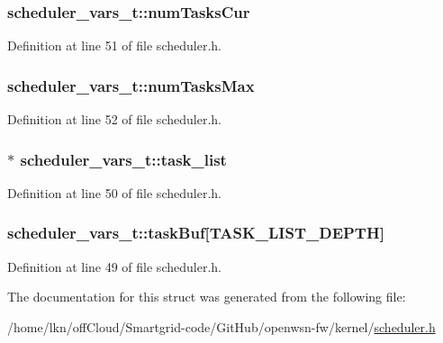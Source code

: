 \subsubsection[{\texorpdfstring{num\+Tasks\+Cur}{numTasksCur}}]{ scheduler\+\_\+vars\+\_\+t\+::num\+Tasks\+Cur}\hypertarget{structscheduler__vars__t_a5847653bd49ad9fcd6474f5ab43b8440}{}\label{structscheduler__vars__t_a5847653bd49ad9fcd6474f5ab43b8440}


Definition at line 51 of file scheduler.\+h.

\subsubsection[{\texorpdfstring{num\+Tasks\+Max}{numTasksMax}}]{ scheduler\+\_\+vars\+\_\+t\+::num\+Tasks\+Max}\hypertarget{structscheduler__vars__t_ad2a68894b5c8d2ca6199fc6201429d6d}{}\label{structscheduler__vars__t_ad2a68894b5c8d2ca6199fc6201429d6d}


Definition at line 52 of file scheduler.\+h.

\subsubsection[{\texorpdfstring{task\+\_\+list}{task_list}}]{$\ast$ scheduler\+\_\+vars\+\_\+t\+::task\+\_\+list}\hypertarget{structscheduler__vars__t_ac11491c1035581debc6a9572d257cd35}{}\label{structscheduler__vars__t_ac11491c1035581debc6a9572d257cd35}


Definition at line 50 of file scheduler.\+h.

\subsubsection[{\texorpdfstring{task\+Buf}{taskBuf}}]{ scheduler\+\_\+vars\+\_\+t\+::task\+Buf\mbox{[}{\bf T\+A\+S\+K\+\_\+\+L\+I\+S\+T\+\_\+\+D\+E\+P\+TH}\mbox{]}}\hypertarget{structscheduler__vars__t_a2e0fbcb73c0b0dcf626505eb0f7afab5}{}\label{structscheduler__vars__t_a2e0fbcb73c0b0dcf626505eb0f7afab5}


Definition at line 49 of file scheduler.\+h.



The documentation for this struct was generated from the following file\+:\begin{DoxyCompactItemize}
\item 
/home/lkn/off\+Cloud/\+Smartgrid-\/code/\+Git\+Hub/openwsn-\/fw/kernel/\hyperlink{scheduler_8h}{scheduler.\+h}\end{DoxyCompactItemize}
